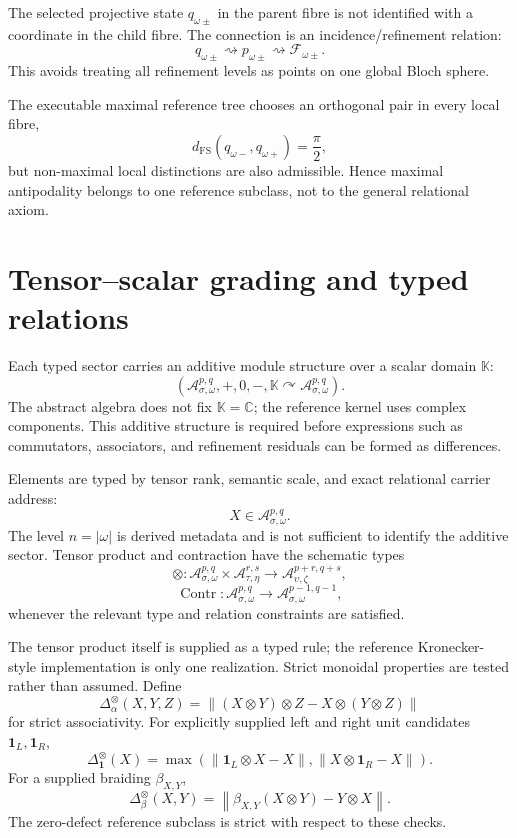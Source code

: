 \documentclass[11pt]{article}
\newcommand{\FS}{\mathrm{FS}}
\begin{document}
The selected projective state \(q_{\omega\pm}\) in the parent fibre is
not identified with a coordinate in the child fibre. The connection is an
incidence/refinement relation:
\[
q_{\omega\pm}
\rightsquigarrow
p_{\omega\pm}
\rightsquigarrow
\mathcal F_{\omega\pm}.
\]
This avoids treating all refinement levels as points on one global Bloch
sphere.

The executable maximal reference tree chooses an orthogonal pair in every
local fibre,
\[
d_{\FS}(q_{\omega-},q_{\omega+})=\frac{\pi}{2},
\]
but non-maximal local distinctions are also admissible. Hence maximal
antipodality belongs to one reference subclass, not to the general relational
axiom.

\section{Tensor--scalar grading and typed relations}

Each typed sector carries an additive module structure over a scalar domain \(\mathbb K\):
\[
\boxed{
(\mathcal A_{\sigma,\omega}^{p,q},+,0,-,\mathbb K\curvearrowright\mathcal A_{\sigma,\omega}^{p,q}).
}
\]
The abstract algebra does not fix \(\mathbb K=\mathbb C\); the reference kernel uses complex components. This additive structure is required before expressions such as commutators, associators, and refinement residuals can be formed as differences.

Elements are typed by tensor rank, semantic scale, and exact relational carrier address:
\[
X\in\mathcal A_{\sigma,\omega}^{p,q}.
\]
The level \(n=|\omega|\) is derived metadata and is not sufficient to identify the additive sector.
Tensor product and contraction have the schematic types
\[
\otimes:
\mathcal A_{\sigma,\omega}^{p,q}\times
\mathcal A_{\tau,\eta}^{r,s}
\to
\mathcal A_{\upsilon,\zeta}^{p+r,q+s},
\]
\[
\operatorname{Contr}:
\mathcal A_{\sigma,\omega}^{p,q}
\to
\mathcal A_{\sigma,\omega}^{p-1,q-1},
\]
whenever the relevant type and relation constraints are satisfied.

The tensor product itself is supplied as a typed rule; the reference
Kronecker-style implementation is only one realization. Strict monoidal
properties are tested rather than assumed. Define
\[
\boxed{
\Delta_{\alpha}^{\otimes}(X,Y,Z)
=
\left\|
(X\otimes Y)\otimes Z
-
X\otimes(Y\otimes Z)
\right\|
}
\]
for strict associativity. For explicitly supplied left and right unit
candidates \(\mathbf 1_L,\mathbf 1_R\),
\[
\boxed{
\Delta_{\mathbf 1}^{\otimes}(X)
=
\max\left(
\|\mathbf 1_L\otimes X-X\|,
\|X\otimes\mathbf 1_R-X\|
\right).
}
\]
For a supplied braiding \(\beta_{X,Y}\),
\[
\boxed{
\Delta_{\beta}^{\otimes}(X,Y)
=
\left\|
\beta_{X,Y}(X\otimes Y)-Y\otimes X
\right\|.
}
\]
The zero-defect reference subclass is strict with respect to these checks.
\end{document}
